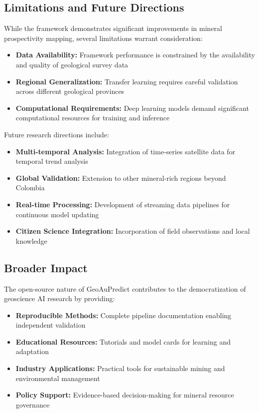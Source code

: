 \documentclass[12pt,a4paper]{article}
\begin{document}
\subsection{Limitations and Future Directions}
While the framework demonstrates significant improvements in mineral prospectivity mapping, several limitations warrant consideration:

\begin{itemize}
    \item \textbf{Data Availability:} Framework performance is constrained by the availability and quality of geological survey data
    \item \textbf{Regional Generalization:} Transfer learning requires careful validation across different geological provinces
    \item \textbf{Computational Requirements:} Deep learning models demand significant computational resources for training and inference
\end{itemize}

Future research directions include:
\begin{itemize}
    \item \textbf{Multi-temporal Analysis:} Integration of time-series satellite data for temporal trend analysis
    \item \textbf{Global Validation:} Extension to other mineral-rich regions beyond Colombia
    \item \textbf{Real-time Processing:} Development of streaming data pipelines for continuous model updating
    \item \textbf{Citizen Science Integration:} Incorporation of field observations and local knowledge
\end{itemize}

\subsection{Broader Impact}
The open-source nature of GeoAuPredict contributes to the democratization of geoscience AI research by providing:

\begin{itemize}
    \item \textbf{Reproducible Methods:} Complete pipeline documentation enabling independent validation
    \item \textbf{Educational Resources:} Tutorials and model cards for learning and adaptation
    \item \textbf{Industry Applications:} Practical tools for sustainable mining and environmental management
    \item \textbf{Policy Support:} Evidence-based decision-making for mineral resource governance
\end{itemize}
\end{document}
